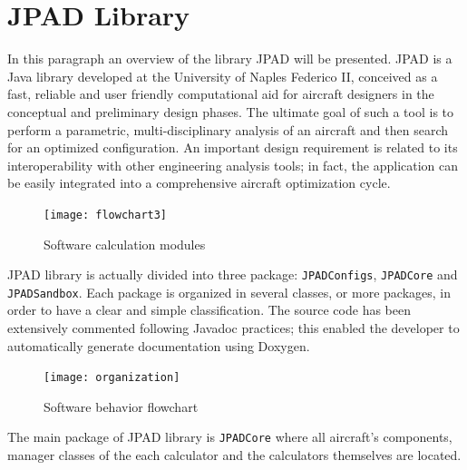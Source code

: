 \section{\gls{JPAD} Library}
In this paragraph an overview of the library \gls{JPAD} will be presented. \gls{JPAD} is a Java library developed at the University of Naples Federico II, conceived as a fast, reliable and user friendly computational aid for aircraft designers in the conceptual and preliminary design phases. The ultimate goal of such a tool is to perform a parametric, multi-disciplinary analysis of an aircraft and then search for an optimized configuration. An important design requirement is related to its interoperability with other engineering analysis tools; in fact, the application can be easily integrated into a comprehensive aircraft optimization cycle. 
%
\begin{figure}[!t]
	\centering
	\texttt{[image: flowchart3]}
	\caption{Software calculation modules}
	\label{fig:guiStart}
\end{figure}

\noindent
\gls{JPAD} library is actually divided into three package: \lstinline[language=Java]!JPADConfigs!, \lstinline[language=Java]!JPADCore! and \lstinline[language=Java]!JPADSandbox!. Each package is organized in several classes, or more packages, in order to have a clear and simple classification. The source code has been extensively commented following Javadoc practices; this enabled the developer to automatically generate documentation using Doxygen\cite{doxgen}.
%
\begin{figure}[!b]
	\centering
	\texttt{[image: organization]}
	\caption{Software behavior flowchart}
	\label{fig:sw}
\end{figure}
%
The main package of \gls{JPAD} library is \lstinline[language=Java]!JPADCore! where all aircraft's components, manager classes of the each calculator and the calculators themselves are located.


